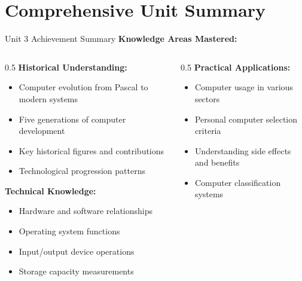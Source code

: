 \documentclass[aspectratio=169]{beamer}
\begin{document}
\section{Comprehensive Unit Summary}

\begin{frame}{Unit 3 Achievement Summary}
    \textbf{Knowledge Areas Mastered:}
    
    \begin{columns}
        \begin{column}{0.5\textwidth}
            \textbf{Historical Understanding:}
            \begin{itemize}
                \item Computer evolution from Pascal to modern systems
                \item Five generations of computer development
                \item Key historical figures and contributions
                \item Technological progression patterns
            \end{itemize}
            
            \vspace{0.3cm}
            \textbf{Technical Knowledge:}
            \begin{itemize}
                \item Hardware and software relationships
                \item Operating system functions
                \item Input/output device operations
                \item Storage capacity measurements
            \end{itemize}
        \end{column}
        \begin{column}{0.5\textwidth}
            \textbf{Practical Applications:}
            \begin{itemize}
                \item Computer usage in various sectors
                \item Personal computer selection criteria
                \item Understanding side effects and benefits
                \item Computer classification systems
            \end{itemize}
            

\end{column}
\end{columns}
\end{frame}
\end{document}
